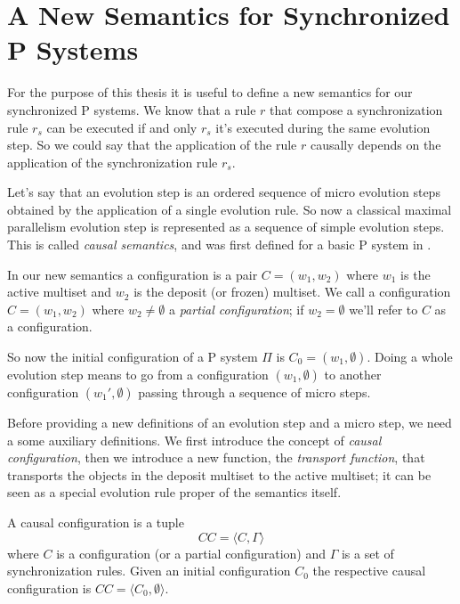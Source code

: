 \chapter{A New Semantics for Synchronized P Systems}

For the purpose of this thesis it is useful to define a new semantics for our synchronized P systems.
We know that a rule $r$ that compose a synchronization rule $r_s$ can be executed if and only $r_s$ it's executed during the same evolution step. 
So we could say that the application of the rule $r$ causally depends on the application of the synchronization rule $r_s$.\newline

Let's say that an evolution step is an ordered sequence of micro evolution steps obtained by the application of a single evolution rule.
So now a classical maximal parallelism evolution step is represented as a sequence of simple evolution steps.
This is called \textit{causal semantics}, and was first defined for a basic P system in \cite{busi2007causality}.

\begin{definition}
    In our new semantics a configuration is a pair $C=(w_1,w_2)$ where $w_1$ is the active multiset and $w_2$ is the deposit (or frozen) multiset.\newline
    We call a configuration $C=(w_1,w_2)$ where $w_2 \neq \emptyset$ a \textit{partial configuration}; if $w_2 = \emptyset$ we'll refer to $C$ as a configuration.
\end{definition}

So now the initial configuration of a P system $\Pi$ is $C_0=(w_1,\emptyset)$.
Doing a whole evolution step means to go from a configuration $(w_1,\emptyset)$ to another configuration $(w_1',\emptyset)$ passing through a sequence of micro steps.

Before providing a new definitions of an evolution step and a micro step, we need a some auxiliary definitions.
We first introduce the concept of \textit{causal configuration}, then we introduce a new function, the \textit{transport function}, that transports the objects in the deposit multiset to the active multiset; it can be seen as a special evolution rule proper of the semantics itself.

\begin{definition}
    A causal configuration is a tuple 
    \[CC = \langle C, \Gamma \rangle\]
    where $C$ is a configuration (or a partial configuration) and $\Gamma$ is a set of synchronization rules.
    Given an initial configuration $C_0$ the respective causal configuration is $CC = \langle C_0,\emptyset\rangle$.
\end{definition}

